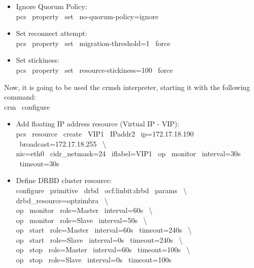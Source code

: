 \documentclass[a4paper, 12pt]{book}
\begin{document}
\begin{itemize}
	\item Ignore Quorum Policy:\\
		pcs \ property \ set \ no-quorum-policy=ignore
\end{itemize}


\begin{itemize}
	\item Set reconnect attempt:\\
		pcs \ property \ set \ migration-threshold=1 \ \textminus \textminus force
\end{itemize}


\begin{itemize}
	\item Set stickiness:\\
		pcs \ property \ set \ resource-stickiness=100 \ \textminus \textminus force
\end{itemize}

\bigskip

\noindent Now, it is going to be used the crmsh interpreter, starting it with the following command:\\
	\indent crm \ configure

\bigskip
	
\begin{itemize}
	\item Add floating IP address resource (Virtual IP - VIP):\\
		pcs \ resource \ create \ VIP1 \ IPaddr2 \ ip=172.17.18.190 \ broadcast=172.17.18.255 \ \textbackslash \\
			nic=eth0 \ cidr\_netmask=24 \ iflabel=VIP1 \ op \ monitor \ interval=30s \ timeout=30s
\end{itemize}


\begin{itemize}
	\item Define DRBD cluster resource:\\
		configure \ primitive \ drbd \ ocf:linbit:drbd \ params \ \textbackslash \\
			drbd\_resource=optzimbra \ \textbackslash \\
			op \ monitor \ role=Master \ interval=60s \ \textbackslash \\
			op \ monitor \ role=Slave \ interval=50s \ \textbackslash \\
			op \ start \ role=Master \ interval=60s \ timeout=240s \ \textbackslash \\
			op \ start \ role=Slave \ interval=0s \ timeout=240s \ \textbackslash \\
			op \ stop \ role=Master \ interval=60s \ timeout=100s \ \textbackslash \\
			op \ stop \ role=Slave \ interval=0s \ timeout=100s
\end{itemize}
\end{document}
